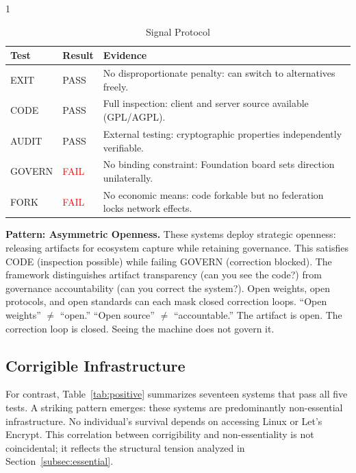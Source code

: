 \documentclass{article}
\begin{document}
\begin{table}[htbp]
    \begin{subtable}{1\textwidth}
        \centering
        \caption{Signal Protocol}
        \small
        \begin{tabular}{@{}llp{8.5cm}@{}}
            \toprule
            \textbf{Test} & \textbf{Result} & \textbf{Evidence} \\
            \midrule
            EXIT & \textcolor{green!50!black}{PASS} & No disproportionate penalty: can switch to alternatives freely. \\
            CODE & \textcolor{green!50!black}{PASS} & Full inspection: client and server source available (GPL/AGPL). \\
            AUDIT & \textcolor{green!50!black}{PASS} & External testing: cryptographic properties independently verifiable. \\
            GOVERN & \textcolor{red}{FAIL} & No binding constraint: Foundation board sets direction unilaterally. \\
            FORK & \textcolor{red}{FAIL} & No economic means: code forkable but no federation locks network effects. \\
            \bottomrule
        \end{tabular}
    \end{subtable}
\end{table}

\textbf{Pattern: Asymmetric Openness.} These systems deploy strategic openness: releasing artifacts for ecosystem capture while retaining governance. This satisfies CODE (inspection possible) while failing GOVERN (correction blocked). The framework distinguishes artifact transparency (can you see the code?) from governance accountability (can you correct the system?). Open weights, open protocols, and open standards can each mask closed correction loops. ``Open weights'' $\neq$ ``open.'' ``Open source'' $\neq$ ``accountable.'' The artifact is open. The correction loop is closed. Seeing the machine does not govern it.

\subsection{Corrigible Infrastructure}

For contrast, Table~\ref{tab:positive} summarizes seventeen systems that pass all five tests. A striking pattern emerges: these systems are predominantly non-essential infrastructure. No individual's survival depends on accessing Linux or Let's Encrypt. This correlation between corrigibility and non-essentiality is not coincidental; it reflects the structural tension analyzed in Section~\ref{subsec:essential}.
\end{document}
